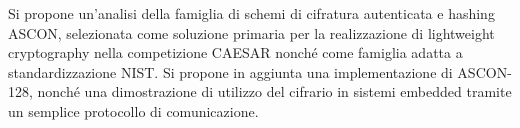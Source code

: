 \noindent
Si propone un'analisi della famiglia di schemi di cifratura autenticata e hashing ASCON, selezionata come soluzione primaria per la realizzazione di lightweight cryptography nella competizione CAESAR nonché come famiglia adatta a standardizzazione NIST. Si propone in aggiunta una implementazione di ASCON-128, nonché una dimostrazione di utilizzo del cifrario in sistemi embedded tramite un semplice protocollo di comunicazione.  